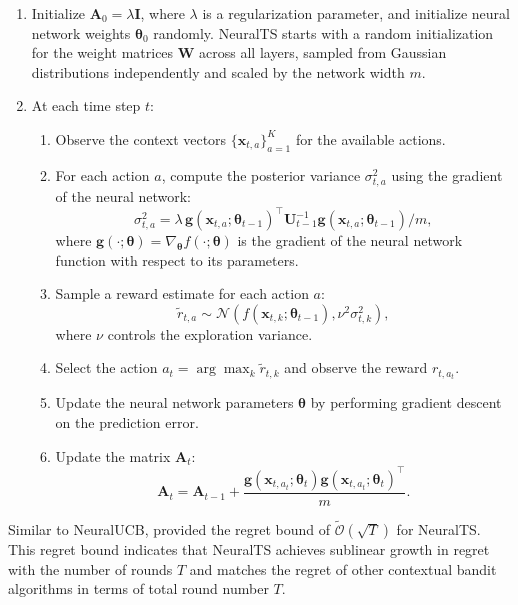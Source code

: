 \begin{enumerate}  
    \item Initialize $\mathbf{A}_0 = \lambda \mathbf{I}$, where $\lambda$ is a regularization parameter, and initialize neural network weights $\boldsymbol{\theta}_0$ randomly. NeuralTS starts with a random initialization for the weight matrices $\mathbf{W}$ across all layers, sampled from Gaussian distributions independently and scaled by the network width \(m\).  
    \item At each time step \(t\):  
    \begin{enumerate}  
        \item Observe the context vectors $\{\mathbf{x}_{t,a}\}_{a=1}^K$ for the available actions.  
        \item For each action \(a\), compute the posterior variance $\sigma^2_{t,a}$ using the gradient of the neural network:  
        \[  
        \sigma^2_{t,a} = \lambda \, \mathbf{g}(\mathbf{x}_{t,a}; \boldsymbol{\theta}_{t-1})^\top \mathbf{U}_{t-1}^{-1} \mathbf{g}(\mathbf{x}_{t,a}; \boldsymbol{\theta}_{t-1}) / m,  
        \]  
        where $\mathbf{g}(\cdot; \boldsymbol{\theta}) = \nabla_{\boldsymbol{\theta}} f(\cdot; \boldsymbol{\theta})$ is the gradient of the neural network function with respect to its parameters.  
        \item Sample a reward estimate for each action \(a\):  
        \[  
        \tilde{r}_{t,a} \sim \mathcal{N}(f(\mathbf{x}_{t,k}; \boldsymbol{\theta}_{t-1}), \nu^2 \sigma^2_{t,k}),  
        \]  
        where \(\nu\) controls the exploration variance.  
        \item Select the action \(a_t = \arg\max_k \tilde{r}_{t,k}\) and observe the reward \(r_{t,a_t}\).  
        \item Update the neural network parameters \(\boldsymbol{\theta}\) by performing gradient descent on the prediction error.  
        \item Update the matrix $\mathbf{A}_t$:  
        \[  
        \mathbf{A}_t = \mathbf{A}_{t-1} + \frac{\mathbf{g}(\mathbf{x}_{t,a_t}; \boldsymbol{\theta}_t) \mathbf{g}(\mathbf{x}_{t,a_t}; \boldsymbol{\theta}_t)^\top}{m}.  
        \]  
    \end{enumerate}  
\end{enumerate}  
 
Similar to NeuralUCB, \citet{zhang2021neural} provided the regret bound of $\widetilde{\mathcal{O}}(\sqrt{T})$ for NeuralTS. This regret bound indicates that NeuralTS achieves sublinear growth in regret with the number of rounds $T$ and matches the regret of other contextual bandit algorithms in terms of total round number $T$.




